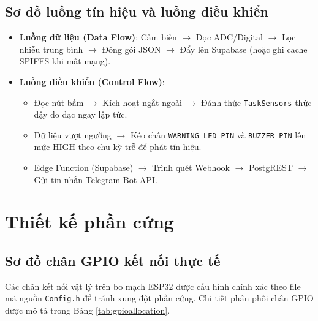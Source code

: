 \subsection{Sơ đồ luồng tín hiệu và luồng điều khiển}
\begin{itemize}
    \item \textbf{Luồng dữ liệu (Data Flow)}: Cảm biến $\rightarrow$ Đọc ADC/Digital $\rightarrow$ Lọc nhiễu trung bình $\rightarrow$ Đóng gói JSON $\rightarrow$ Đẩy lên Supabase (hoặc ghi cache SPIFFS khi mất mạng).
    \item \textbf{Luồng điều khiển (Control Flow)}: 
  \begin{itemize}
      \item Đọc nút bấm $\rightarrow$ Kích hoạt ngắt ngoài $\rightarrow$ Đánh thức \texttt{TaskSensors} thức dậy đo đạc ngay lập tức.
      \item Dữ liệu vượt ngưỡng $\rightarrow$ Kéo chân \texttt{WARNING\_LED\_PIN} và \texttt{BUZZER\_PIN} lên mức HIGH theo chu kỳ trễ để phát tín hiệu.
      \item Edge Function (Supabase) $\rightarrow$ Trình quét Webhook $\rightarrow$ PostgREST $\rightarrow$ Gửi tin nhắn Telegram Bot API.
    \end{itemize}
\end{itemize}

\section{Thiết kế phần cứng}
\subsection{Sơ đồ chân GPIO kết nối thực tế}
Các chân kết nối vật lý trên bo mạch ESP32 được cấu hình chính xác theo file mã nguồn \texttt{Config.h} để tránh xung đột phần cứng. Chi tiết phân phối chân GPIO được mô tả trong Bảng \ref{tab:gpioallocation}.

